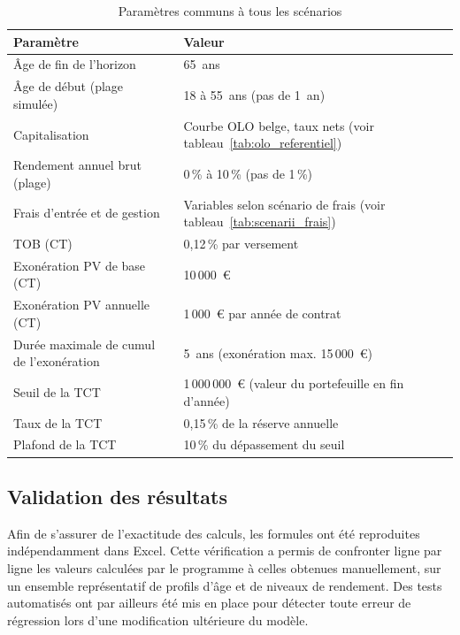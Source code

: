 ﻿\documentclass[12pt, a4paper]{article}
\begin{document}
\begin{table}[h!]
  \centering
  \caption{Paramètres communs à tous les scénarios}
  \label{tab:params_communs}
  \begin{tabular}{ll}
    \hline
    \textbf{Paramètre} & \textbf{Valeur} \\
    \hline
    Âge de fin de l'horizon & 65~ans \\
    Âge de début (plage simulée) & 18 à 55~ans (pas de 1~an) \\
    Capitalisation & Courbe OLO belge, taux nets (voir tableau~\ref{tab:olo_referentiel}) \\
    Rendement annuel brut (plage) & 0\,\% à 10\,\% (pas de 1\,\%) \\
    Frais d'entrée et de gestion & Variables selon scénario de frais (voir tableau~\ref{tab:scenarii_frais}) \\
    TOB (CT) & 0,12\,\% par versement \\
    Exonération PV de base (CT) & 10\,000~€ \\
    Exonération PV annuelle (CT) & 1\,000~€ par année de contrat \\
    Durée maximale de cumul de l'exonération & 5~ans (exonération max. 15\,000~€) \\
    Seuil de la TCT & 1\,000\,000~€ (valeur du portefeuille en fin d'année) \\
    Taux de la TCT & 0,15\,\% de la réserve annuelle \\
    Plafond de la TCT & 10\,\% du dépassement du seuil \\
    \hline
  \end{tabular}
\end{table}



\subsection{Validation des résultats}

Afin de s'assurer de l'exactitude des calculs, les formules ont été reproduites
indépendamment dans Excel. Cette vérification a permis de confronter
ligne par ligne les valeurs calculées par le programme à celles obtenues
manuellement, sur un ensemble représentatif de profils d'âge et de niveaux de
rendement. Des tests automatisés ont par ailleurs été mis en place pour détecter
toute erreur de régression lors d'une modification ultérieure du modèle.

\newpage

\end{document}
